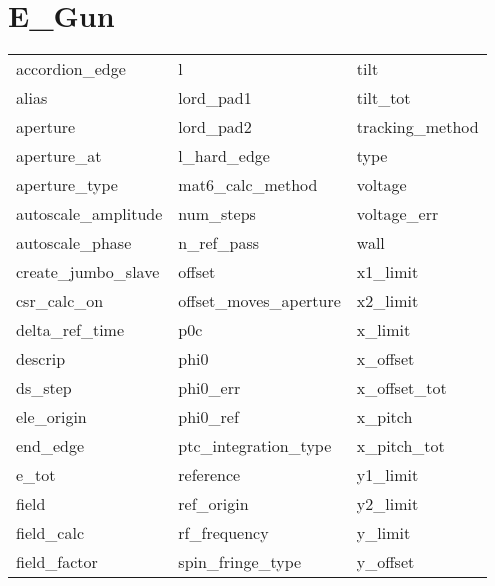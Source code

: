  \section{E_Gun}
 \label{s:list.e.gun}
 
 \begin{tabular}{lll} \toprule
accordion_edge              & l                           & tilt                        \\
alias                       & lord_pad1                   & tilt_tot                    \\
aperture                    & lord_pad2                   & tracking_method             \\
aperture_at                 & l_hard_edge                 & type                        \\
aperture_type               & mat6_calc_method            & voltage                     \\
autoscale_amplitude         & num_steps                   & voltage_err                 \\
autoscale_phase             & n_ref_pass                  & wall                        \\
create_jumbo_slave          & offset                      & x1_limit                    \\
csr_calc_on                 & offset_moves_aperture       & x2_limit                    \\
delta_ref_time              & p0c                         & x_limit                     \\
descrip                     & phi0                        & x_offset                    \\
ds_step                     & phi0_err                    & x_offset_tot                \\
ele_origin                  & phi0_ref                    & x_pitch                     \\
end_edge                    & ptc_integration_type        & x_pitch_tot                 \\
e_tot                       & reference                   & y1_limit                    \\
field                       & ref_origin                  & y2_limit                    \\
field_calc                  & rf_frequency                & y_limit                     \\
field_factor                & spin_fringe_type            & y_offset                    \\

\end{tabular}
